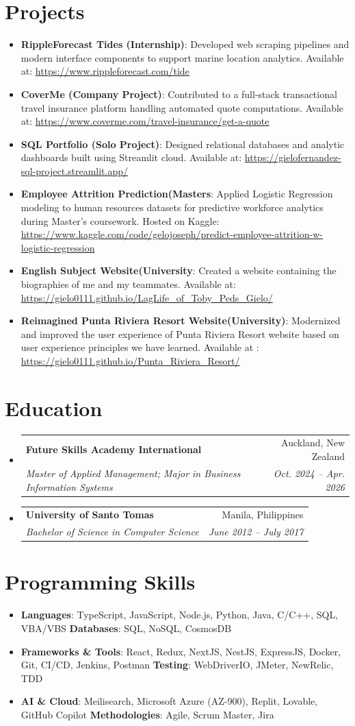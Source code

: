 \documentclass[letterpaper,11pt]{article}
\makeatletter
\newcommand{\resumeItem}[2]{
  \item\small{
    \textbf{#1}{: #2 \vspace{-2pt}}
  }
}
\newcommand{\resumeSubheading}[4]{
  \vspace{-1pt}\item
    \begin{tabular*}{0.97\textwidth}{l@{\extracolsep{\fill}}r}
      \textbf{#1} & #2 \\
      \textit{\small#3} & \textit{\small #4} \\
    \end{tabular*}\vspace{-5pt}
}
\newcommand{\resumeSubItem}[2]{\resumeItem{#1}{#2}\vspace{-4pt}}
\newcommand{\resumeSubHeadingListStart}{\begin{itemize}[leftmargin=*]}
\newcommand{\resumeSubHeadingListEnd}{\end{itemize}}
\makeatother
\begin{document}
\section{Projects}
  \resumeSubHeadingListStart
    \resumeSubItem{RippleForecast Tides (Internship)}
      {Developed web scraping pipelines and modern interface components to support marine location analytics. Available at: \url{https://www.rippleforecast.com/tide}}
    \resumeSubItem{CoverMe (Company Project)}
      {Contributed to a full-stack transactional travel insurance platform handling automated quote computations. Available at: \url{https://www.coverme.com/travel-insurance/get-a-quote}}
    \resumeSubItem{SQL Portfolio (Solo Project)}
      {Designed relational databases and analytic dashboards built using Streamlit cloud. Available at: \url{https://gielofernandez-sql-project.streamlit.app/}}
    \resumeSubItem{Employee Attrition Prediction(Masters}
      {Applied Logistic Regression modeling to human resources datasets for predictive workforce analytics during Master's coursework. Hosted on Kaggle: \url{https://www.kaggle.com/code/gelojoseph/predict-employee-attrition-w-logistic-regression}}
    \resumeSubItem{English Subject Website(University}
      {Created a website containing the biographies of me and my teammates. Available at: \url{https://gielo0111.github.io/LagLife_of_Toby_Peds_Gielo/}}
    \resumeSubItem{Reimagined Punta Riviera Resort Website(University)}
      {Modernized and improved the user experience of Punta Riviera Resort website based on user experience principles we have learned. Available at : \url{https://gielo0111.github.io/Punta_Riviera_Resort/}}
  \resumeSubHeadingListEnd


\section{Education}
  \resumeSubHeadingListStart
    \resumeSubheading
      {Future Skills Academy International}{Auckland, New Zealand}
      {Master of Applied Management; Major in Business Information Systems}{Oct. 2024 -- Apr. 2026}
    \resumeSubheading
      {University of Santo Tomas}{Manila, Philippines}
      {Bachelor of Science in Computer Science}{June 2012 -- July 2017}
  \resumeSubHeadingListEnd


\section{Programming Skills}
 \resumeSubHeadingListStart
   \item{
     \textbf{Languages}{: TypeScript, JavaScript, Node.js, Python, Java, C/C++, SQL, VBA/VBS}
     \hfill
     \textbf{Databases}{: SQL, NoSQL, CosmosDB}
   }
   \item{
     \textbf{Frameworks \& Tools}{: React, Redux, NextJS, NestJS, ExpressJS, Docker, Git, CI/CD, Jenkins, Postman}
     \hfill
     \textbf{Testing}{: WebDriverIO, JMeter, NewRelic, TDD}
   }
   \item{
     \textbf{AI \& Cloud}{: Meilisearch, Microsoft Azure (AZ-900), Replit, Lovable, GitHub Copilot}
     \hfill
     \textbf{Methodologies}{: Agile, Scrum Master, Jira}
   }
 \resumeSubHeadingListEnd
\end{document}
